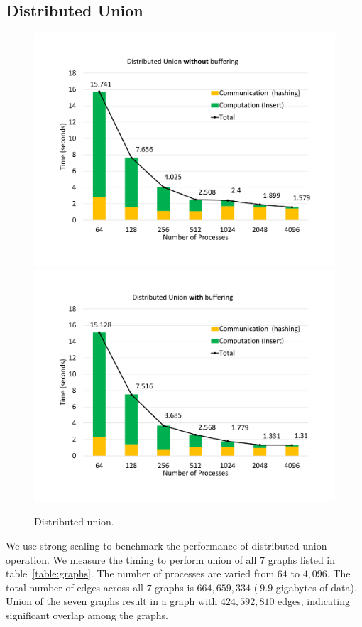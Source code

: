 
\subsection{Distributed Union}
\label{sec:union}

\begin{figure}[t]
	{\includegraphics[width=.50\textwidth,  trim={0cm 0cm 0cm 0cm, 
			clip}]{results/union_without_buffering_final.pdf}}\hfill%
	{\includegraphics[width=.50\textwidth,  trim={0cm 0cm 0cm 0cm,
			clip}]{results/union_with_buffering_final.pdf}}\hfill%
	\centering
	\caption{Distributed union.}
	\label{fig:dist_union}
\end{figure}

We use strong scaling to benchmark the performance of distributed union operation. We measure the timing to perform union of all 7 graphs listed in table~\ref{table:graphs}. The number of processes are varied from $64$ to $4,096$. The total number of edges across all $7$ graphs is $664,659,334$ ($~9.9$ gigabytes of data). Union of the seven graphs result in a graph with $424,592,810$ edges, indicating significant overlap among the graphs.

